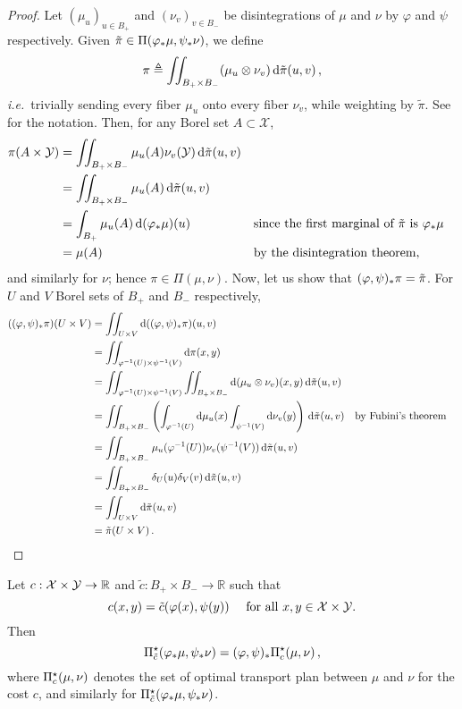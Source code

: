 \begin{proof}
Let $(\mu_u)_{u\in B_+}$ and $(\nu_v)_{v\in B_-}$ be disintegrations of $\mu$ and $\nu$ by $\varphi$ and $\psi$ respectively.
Given $\tilde\pi \in \Pi(\varphi_*\mu,\psi_*\nu)$, we define $$\pi\triangleq \iint _{ B_+\times B_-}(\mu_{u}\otimes \nu_{v})\, \mathrm d \tilde\pi(u,v)\,,$$
\textit{i.e.}~trivially sending every fiber $\mu_{u}$ onto every fiber $\nu_{v}$, while weighting by $\tilde\pi$. See \cite[Sec.~5.3]{ambrosio2005gradient} for the notation. Then, for any Borel set $A\subset \mathcal{X}$,
\begin{align*}
\pi(A\times \mathcal{Y}) & =\iint _{ B_+\times B_-}\mu_{u}(A)\nu_{v}(\mathcal{Y})\, \mathrm d\tilde\pi(u,v) \\
& =\iint _{ B_+\times B_-}\mu_{u}(A)\, \mathrm d\tilde\pi(u,v) \\
& =\int _{ B_+}\mu_{u}(A)\, \mathrm d(\varphi_*\mu)(u)  &  & \text{since the first marginal of }\tilde\pi \text{ is } \varphi_*\mu\\
    & = \mu(A) &  & \text{by the disintegration theorem,}
\end{align*}
and similarly for $\nu$; hence $\pi \in \Pi(\mu,\nu)$. Now, let us show that $(\varphi,\psi)_*\pi=\tilde\pi$. For $U$ and $V$ Borel sets of $B_+$ and $B_-$ respectively,
\begin{align*}
((\varphi,\psi)_*\pi)(U\times V) & =\iint _{U\times V}\mathrm d((\varphi,\psi)_*\pi)(u,v) \\
    & =\iint _{\varphi ^{-1}(U)\times \psi ^{-1}(V)}\mathrm d\pi(x,y) \\
    & =\iint _{\varphi ^{-1}(U)\times \psi ^{-1}(V)}\iint _{ B_+\times B_-}\mathrm d(\mu_{u}\otimes \nu_{v})(x,y)\, \mathrm d\tilde\pi(u,v) \\
    & =\iint_{ B_+\times B_-}\left(\int _{\varphi ^{-1}(U)}\mathrm d\mu_{u}(x)\int _{ \psi ^{-1}(V)}\mathrm d \nu_{v}(y)\right)\, \mathrm d\tilde\pi(u,v)  &  & \text{by Fubini's theorem}\\
    & =\iint_{ B_+\times B_-}\mu_u(\varphi ^{-1}(U))\nu_v(\psi ^{-1}(V))\, \mathrm d\tilde\pi(u,v)\\
    & =\iint_{ B_+\times B_-}\delta_{U}(u)\delta_{V}(v)\, \mathrm d\tilde\pi(u,v)\\
    & =\iint_{U\times V}\mathrm d\tilde\pi(u,v)\\
    & =\tilde\pi(U\times V)\,. && \qedhere
\end{align*}
\end{proof}

\begin{lemma}
    \label{lemma:decomp-manifold}
    Let $c: \mathcal{X} \times \mathcal{Y} \to \mathbb{R}$ and $\tilde c: B_+ \times B_-\to \mathbb{R}$ such that $$c(x,y)=\tilde c(\varphi(x),\psi(y))\quad \text{ for all } x,y\in \mathcal{X} \times \mathcal{Y}.$$
    Then $$\Pi^\star_{\tilde c}(\varphi_*\mu,\psi_*\nu)=(\varphi,\psi)_*\Pi^\star_{c}(\mu,\nu)\,,$$
    where $\Pi^\star_{c}(\mu,\nu)$ denotes the set of optimal transport plan between $\mu$ and $\nu$ for the cost $c$, and similarly for $\Pi^\star_{\tilde c}(\varphi_*\mu,\psi_*\nu)$.
\end{lemma}

